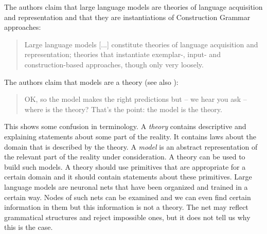 The authors claim that large language models are theories of language acquisition and representation
and that they are instantiations of Construction Grammar \citep{Goldberg2006a} approaches:
\begin{quote}
Large language models [...] constitute theories of language acquisition and representation; theories
that instantiate exemplar-, input- and construction-based approaches, though only very
loosely. \citep[]{AmbridgeBlything2024a}
\end{quote}

\noindent
The authors claim that models are a theory (see also \citealt[360]{Piantadosi2024a}):
\begin{quote}
OK, so the model makes the right predictions but -- we hear you ask -- where is the theory? That's
the point: the model is the theory.
\citep[]{AmbridgeBlything2024a}
\end{quote}
This shows some confusion in terminology. 
A \emph{theory} contains descriptive and explaining statements about some part of the reality. It contains
laws about the domain that is described by the theory. A \emph{model} is an abstract representation of the
relevant part of the reality under consideration. A theory can be used to build such models.
A theory should use primitives that are appropriate for a certain domain and it should contain statements about these
primitives. Large language models are neuronal nets that have been organized and trained in a
certain way. Nodes of such nets can be examined and we can even find certain information in them
\citep{ManningClarkHewitt2020a,ZhangBowman2018a} but this information is not a theory. The net may
reflect grammatical structures and reject impossible ones, but it does not tell us why this is the case.

